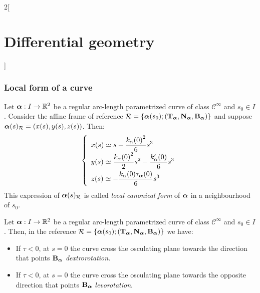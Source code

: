 \documentclass[../../../main.tex]{subfiles}
\begin{document}
\begin{multicols}{2}[\section{Differential geometry}]
  \subsubsection{Local form of a curve}
  \begin{definition}
    Let $\boldsymbol{\mathrm{\alpha}}:I\rightarrow\mathbb{R}^2$ be a regular arc-length parametrized curve of class $\mathcal{C}^\infty$ and $s_0\in I$. Consider the affine frame of reference $\mathcal{R}=\{\boldsymbol{\mathrm{\alpha}}(s_0);({\boldsymbol{\mathrm{T}}_{\boldsymbol{\mathrm{\alpha}}}},{\boldsymbol{\mathrm{N}}_{\boldsymbol{\mathrm{\alpha}}}},{\boldsymbol{\mathrm{B}}_{\boldsymbol{\mathrm{\alpha}}}})\}$ and suppose $\boldsymbol{\mathrm{\alpha}}(s)_{\mathcal{R}}=(x(s),y(s),z(s))$. Then:
    $$\left\{
      \def\arraystretch{2}
      \begin{array}{l}
        \displaystyle x(s)\simeq s-\frac{{k_\alpha(0)}^2}{6}s^3                         \\
        \displaystyle y(s)\simeq \frac{{k_\alpha(0)}^2}{2}s^2-\frac{k_\alpha'(0)}{6}s^3 \\
        \displaystyle z(s)\simeq -\frac{k_\alpha(0)\ta\alpha(0)}{6}s^3                  \\
      \end{array}
      \right.
    $$
    This expression of $\boldsymbol{\mathrm{\alpha}}(s)_{\mathcal{R}}$ is called \emph{local canonical form} of $\boldsymbol{\mathrm{\alpha}}$ in a neighbourhood of $s_0$.
  \end{definition}
  \begin{corollary}
    Let $\boldsymbol{\mathrm{\alpha}}:I\rightarrow\mathbb{R}^2$ be a regular arc-length parametrized curve of class $\mathcal{C}^\infty$ and $s_0\in I$. Then, in the reference $\mathcal{R}=\{\boldsymbol{\mathrm{\alpha}}(s_0);({\boldsymbol{\mathrm{T}}_{\boldsymbol{\mathrm{\alpha}}}},{\boldsymbol{\mathrm{N}}_{\boldsymbol{\mathrm{\alpha}}}},{\boldsymbol{\mathrm{B}}_{\boldsymbol{\mathrm{\alpha}}}})\}$ we have:
    \begin{itemize}
      \item If $\tau <0$, at $s=0$ the curve cross the osculating plane towards the direction that points ${\boldsymbol{\mathrm{B}}_{\boldsymbol{\mathrm{\alpha}}}}$ \emph{dextrorotation}.
      \item If $\tau <0$, at $s=0$ the curve cross the osculating plane towards the opposite direction that points ${\boldsymbol{\mathrm{B}}_{\boldsymbol{\mathrm{\alpha}}}}$ \emph{levorotation}.
    \end{itemize}
  \end{corollary}

\end{multicols}
\end{document}
